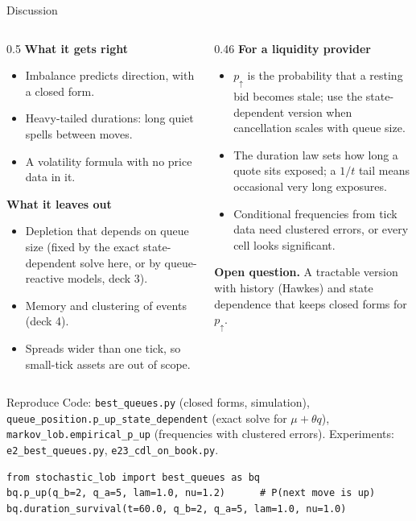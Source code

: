 \documentclass[aspectratio=169,10pt]{beamer}
\begin{document}
\begin{frame}{Discussion}
  \small
  \begin{columns}[T]
    \begin{column}{0.5\textwidth}
      \textbf{What it gets right}
      \begin{itemize}
        \item Imbalance predicts direction, with a closed form.
        \item Heavy-tailed durations: long quiet spells between moves.
        \item A volatility formula with no price data in it.
      \end{itemize}
      \textbf{What it leaves out}
      \begin{itemize}
        \item Depletion that depends on queue size (fixed by the exact state-dependent solve here, or by queue-reactive models, deck 3).
        \item Memory and clustering of events (deck 4).
        \item Spreads wider than one tick, so small-tick assets are out of scope.
      \end{itemize}
    \end{column}
    \begin{column}{0.46\textwidth}
      \textbf{For a liquidity provider}
      \begin{itemize}
        \item $p_\uparrow$ is the probability that a resting bid becomes stale; use the state-dependent version when cancellation scales with queue size.
        \item The duration law sets how long a quote sits exposed; a $1/t$ tail means occasional very long exposures.
        \item Conditional frequencies from tick data need clustered errors, or every cell looks significant.
      \end{itemize}
      \textbf{Open question.} A tractable version with history (Hawkes) and state dependence that keeps closed forms for $p_\uparrow$.
    \end{column}
  \end{columns}
\end{frame}

\begin{frame}[fragile]{Reproduce}
  \small
  Code: \texttt{best\_queues.py} (closed forms, simulation), \texttt{queue\_position.p\_up\_state\_dependent} (exact solve for $\mu + \theta q$), \texttt{markov\_lob.empirical\_p\_up} (frequencies with clustered errors). Experiments: \texttt{e2\_best\_queues.py}, \texttt{e23\_cdl\_on\_book.py}.
\begin{verbatim}
from stochastic_lob import best_queues as bq
bq.p_up(q_b=2, q_a=5, lam=1.0, nu=1.2)      # P(next move is up)
bq.duration_survival(t=60.0, q_b=2, q_a=5, lam=1.0, nu=1.0)
\end{verbatim}
\end{frame}

\deckreferences
\end{document}
